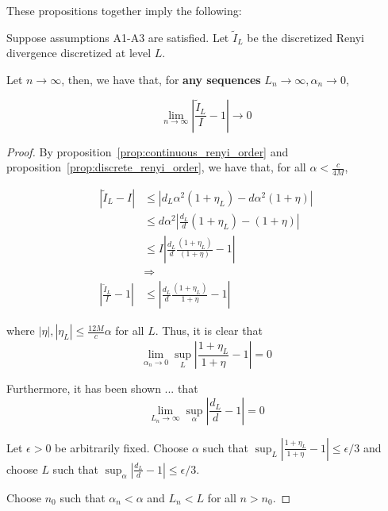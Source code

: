 \documentclass{article}
\begin{document}
These propositions together imply the following:
\begin{shaded}
\begin{theorem}
\label{thm:relative_convergence_discrete_continuous_renyi}
Suppose assumptions A1-A3 are satisfied. Let $\tilde{I}_L$ be the discretized Renyi divergence discretized at level $L$.

Let $n \rightarrow \infty$, then, we have that, for \textbf{any sequences} $L_n \rightarrow \infty, \alpha_n \rightarrow 0$,

\[
\lim_{n \rightarrow \infty} \left| \frac{\tilde{I}_L}{I} - 1 \right| \rightarrow 0
\]

\end{theorem}
\end{shaded}

\begin{proof}

By proposition~\ref{prop:continuous_renyi_order} and proposition~\ref{prop:discrete_renyi_order}, we have that, for all $\alpha < \frac{c}{4M}$,

\begin{align*}
| \tilde{I}_L - I | 
 & \leq \left| d_L \alpha^2 ( 1 + \eta_L) - d \alpha^2 ( 1 + \eta) \right| \\
  &\leq d\alpha^2 \left| \frac{d_L}{d} (1 + \eta_L) - (1+\eta) \right|  \\
 &\leq I \left| \frac{d_L}{d} \frac{(1 + \eta_L)}{(1+\eta)} - 1 \right| \\
& \Rightarrow \\
\left| \frac{\tilde{I}_L}{I} - 1 \right| &\leq 
\left | \frac{d_L}{d} \frac{(1+\eta_L)}{1 + \eta} - 1 \right|
\end{align*}

where $|\eta|, |\eta_L| \leq \frac{12M}{c} \alpha$ for all $L$. Thus, it is clear that 
\[
\lim_{\alpha_n \rightarrow 0} \sup_L \left| \frac{1+\eta_L}{1+\eta} - 1 \right| = 0
\]

Furthermore, it has been shown ... that
\[
\lim_{L_n \rightarrow \infty} \sup_\alpha \left| \frac{d_L}{d} - 1 \right| = 0
\]

Let $\epsilon > 0$ be arbitrarily fixed. 
Choose $\alpha$ such that $\sup_L \left| \frac{1+\eta_L}{1+\eta} - 1 \right| \leq \epsilon/3$ and choose $L$ such that $\sup_\alpha \left| \frac{d_L}{d} -1 \right| \leq \epsilon/3$. 

Choose $n_0$ such that $\alpha_n < \alpha$ and $L_n < L$ for all $n > n_0$. 


\end{proof}
\end{document}
